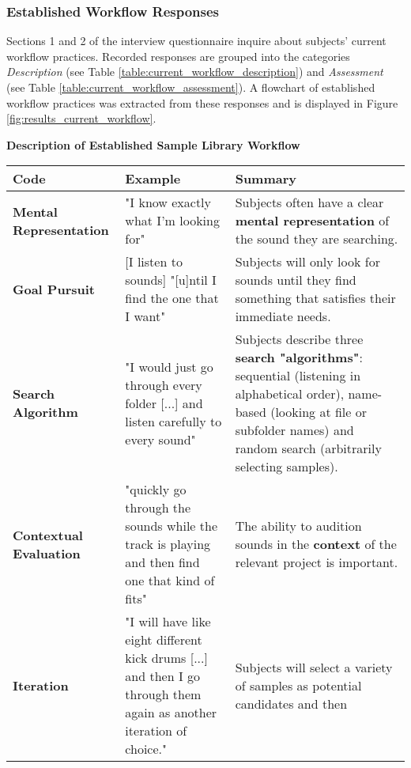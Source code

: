 \clearpage

\subsubsection{Established Workflow Responses}
\label{subsubsec:results_established_workflow}
Sections 1 and 2 of the interview questionnaire inquire about subjects' current
workflow practices. Recorded responses are grouped into the categories
\textit{Description} (see Table \ref{table:current_workflow_description}) and
\textit{Assessment} (see Table \ref{table:current_workflow_assessment}). A
flowchart of established workflow practices was extracted from these responses
and is displayed in Figure \ref{fig:results_current_workflow}.

\begin{table}[!htb]
  \renewcommand{\arraystretch}{1.2}
  \centering
  \textbf{Description of Established Sample Library Workflow} \\ [3mm]
  \footnotesize
  \colorbox{light-bg}{
  \begin{tabular}{ p{4.0cm} p{4.75cm} p{4.75cm} }
  \hline
    \textbf{Code} & \textbf{Example} & \textbf{Summary} \\
    \hline
    \textbf{Mental Representation}
    &
    "I know exactly what I'm looking for"
    &
    Subjects often have a clear \textbf{mental representation} of the sound they
    are searching.
    \\
    \textbf{Goal Pursuit}
    &
    [I listen to sounds] "[u]ntil I find the one that I want"
    &
    Subjects will only look for sounds until they find something that satisfies
    their immediate needs.
    \\
    \textbf{Search Algorithm}
    &
    "I would just go through every folder [...] and listen carefully to every
    sound"
    &
    Subjects describe three \textbf{search "algorithms"}: sequential
    (listening in alphabetical order), name-based (looking at file or subfolder
    names) and random search (arbitrarily selecting samples).
    \\
    \textbf{Contextual Evaluation}
    &
    "quickly go through the sounds while the track is playing and then find
    one that kind of fits"
    &
    The ability to audition sounds in the \textbf{context} of the relevant
    project is important.
    \\
    \textbf{Iteration}
    &
    "I will have like eight different kick drums [...] and then I go through
    them again as another iteration of choice."
    &
    Subjects will select a variety of samples as potential candidates and then

\end{tabular}}
\end{table}
